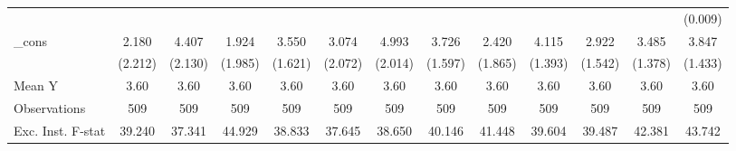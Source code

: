 {\begin{tabular}{l*{12}{c}}
            &                     &                     &                     &                     &                     &                     &                     &                     &                     &                     &                     &     (0.009)         \\
\addlinespace
\_cons      &       2.180         &       4.407\sym{**} &       1.924         &       3.550\sym{**} &       3.074         &       4.993\sym{**} &       3.726\sym{**} &       2.420         &       4.115\sym{***}&       2.922\sym{*}  &       3.485\sym{**} &       3.847\sym{**} \\
            &     (2.212)         &     (2.130)         &     (1.985)         &     (1.621)         &     (2.072)         &     (2.014)         &     (1.597)         &     (1.865)         &     (1.393)         &     (1.542)         &     (1.378)         &     (1.433)         \\
\midrule
Mean Y      &        3.60         &        3.60         &        3.60         &        3.60         &        3.60         &        3.60         &        3.60         &        3.60         &        3.60         &        3.60         &        3.60         &        3.60         \\
Observations&         509         &         509         &         509         &         509         &         509         &         509         &         509         &         509         &         509         &         509         &         509         &         509         \\
Exc. Inst. F-stat&      39.240         &      37.341         &      44.929         &      38.833         &      37.645         &      38.650         &      40.146         &      41.448         &      39.604         &      39.487         &      42.381         &      43.742         \\
\bottomrule
\end{tabular}
}
